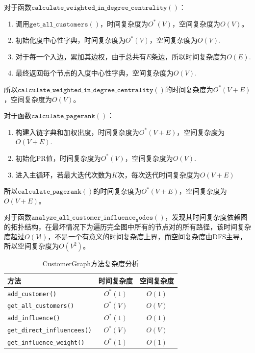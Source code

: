 \documentclass[cn,hazy,blue,10pt,normal]{elegantnote}
\begin{document}
对于函数$\mathtt{calculate\_weighted\_in\_degree\_centrality()}$：
\begin{enumerate}
    \item 调用$\mathtt{get\_all\_customers()}$，时间复杂度为$O^*(V)$，空间复杂度为$O(V)$。
    \item 初始化度中心性字典，时间复杂度为$O^*(V)$，空间复杂度为$O(V)$.
    \item 对于每一个入边，累加其边权，由于总共有$E$条边，所以时间复杂度为$O(E)$.
    \item 最终返回每个节点的入度中心性字典，空间复杂度为$O(V)$.
\end{enumerate}
所以$\mathtt{calculate\_weighted\_in\_degree\_centrality()}$的时间复杂度为$O^*(V+E)$，空间复杂度为$O(V)$。


对于函数$\mathtt{calculate\_pagerank()}$：
\begin{enumerate}
    \item 构建入链字典和加权出度，时间复杂度为$O^*(V+E)$，空间复杂度为$O(V+E)$.
    \item 初始化PR值，时间复杂度为$O^*(V)$，空间复杂度为$O(V)$.
    \item 进入主循环，若最大迭代次数为$K$次，每次迭代时间复杂度为$O(V+E)$
\end{enumerate}
所以$\mathtt{calculate\_pagerank()}$的时间复杂度为$O^*(V+E)$，空间复杂度为$O(V+E)$。

对于函数$\mathtt{analyze\_all\_customer\_influence_nodes()}$，发现其时间复杂度依赖图的拓扑结构，在最坏情况下为遍历完全图中所有的节点对的所有路径，该时间复杂度超过$O(V!)$，不是一个有意义的时间复杂度上界，而空间复杂度由DFS主导，所以空间复杂度为$O(V^2)$。


\begin{table}[t]
    \centering
    \caption{CustomerGraph方法复杂度分析}
    \label{tab: customergraph_complexity}
    \begin{tabular}{lcc}
    \toprule
    方法& 时间复杂度 & 空间复杂度  \\
    \midrule
    \texttt{add\_customer()} & $O^*(1)$ & $O(1)$ \\
    \texttt{get\_all\_customers()} & $O^*(V)$ & $O(V)$ \\
    \texttt{add\_influence()} & $O^*(1)$ & $O(1)$ \\
    \texttt{get\_direct\_influencees()} & $O^*(V)$ & $O(V)$ \\
    \texttt{get\_influence\_weight()} & $O^*(1)$ & $O(1)$ \\
    \bottomrule
    \end{tabular}
\end{table}
\end{document}
